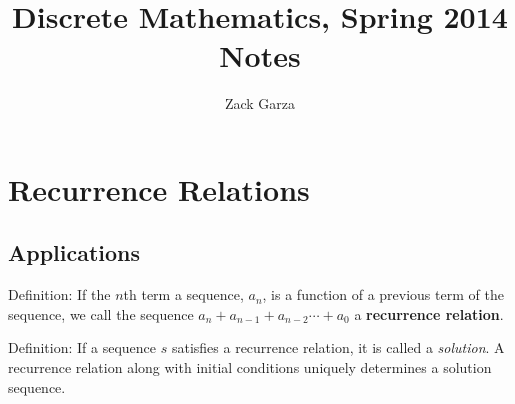 \documentclass[a4paper,10pt]{report}
\begin{document}
\title{Discrete Mathematics, Spring 2014 Notes}
\author{Zack Garza}
\maketitle
\tableofcontents

\chapter{Recurrence Relations}
\section{Applications}
Definition: If the $n$th term a sequence, $a_n$, is a function of a previous term of the sequence, we call the sequence $a_n + a_{n-1} + a_{n-2}\cdots +a_0$ a \textbf{recurrence relation}.

Definition: If a sequence $s$ satisfies a recurrence relation, it is called a \textit{solution}. A recurrence relation along with initial conditions uniquely determines a solution sequence.
\end{document}
